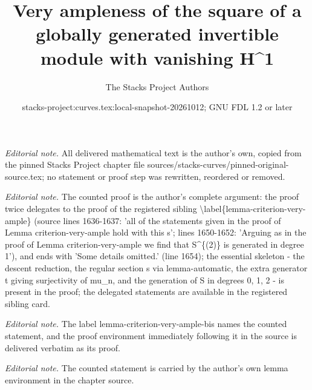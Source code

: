 \documentclass[10pt,a4paper]{amsart}
\title{Very ampleness of the square of a globally generated invertible module with vanishing H\textasciicircum{}1}
\author{The Stacks Project Authors}
\date{stacks-project:curves.tex:local-snapshot-20261012; GNU FDL 1.2 or later}
\theoremstyle{plain}
\theoremstyle{definition}
\theoremstyle{remark}
\numberwithin{equation}{subsection}
\begin{document}
\maketitle
\noindent\textit{Editorial note.} All delivered mathematical text is the author's own, copied from the pinned Stacks Project chapter file sources/stacks-curves/pinned-original-source.tex; no statement or proof step was rewritten, reordered or removed.\par\medskip
\noindent\textit{Editorial note.} The counted proof is the author's complete argument: the proof twice delegates to the proof of the registered sibling \textbackslash{}label\{lemma-criterion-very-ample\} (source lines 1636-1637: 'all of the statements given in the proof of Lemma criterion-very-ample hold with this s'; lines 1650-1652: 'Arguing as in the proof of Lemma criterion-very-ample we find that S\textasciicircum{}\{(2)\} is generated in degree 1'), and ends with 'Some details omitted.' (line 1654); the essential skeleton - the descent reduction, the regular section s via lemma-automatic, the extra generator t giving surjectivity of mu\_n, and the generation of S in degrees 0, 1, 2 - is present in the proof; the delegated statements are available in the registered sibling card.\par\medskip
\noindent\textit{Editorial note.} The label lemma-criterion-very-ample-bis names the counted statement, and the proof environment immediately following it in the source is delivered verbatim as its proof.\par\medskip
\noindent\textit{Editorial note.} The counted statement is carried by the author's own lemma environment in the chapter source.\par\medskip
\end{document}
